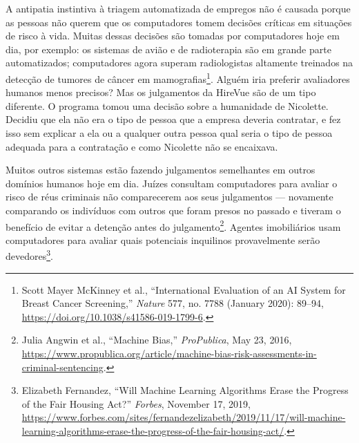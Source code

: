 A antipatia instintiva à triagem automatizada de empregos não é causada porque
as pessoas não querem que os computadores tomem decisões críticas em situações
de risco à vida. Muitas dessas decisões são tomadas por computadores hoje em
dia, por exemplo: os sistemas de avião e de radioterapia são em grande parte 
automatizados; computadores agora superam radiologistas altamente treinados na 
detecção de tumores de câncer em mamografias\footnote{Scott Mayer McKinney et
al., ``International Evaluation of an AI System for Breast Cancer Screening,''
\textit{Nature} 577, no. 7788 (January 2020): 89--94,
\url{https://doi.org/10.1038/s41586-019-1799-6}.}. Alguém iria preferir
avaliadores humanos menos precisos? Mas os julgamentos da HireVue são de um tipo
diferente. O programa tomou uma decisão sobre a humanidade de Nicolette. Decidiu
que ela não era o tipo de pessoa que a empresa deveria contratar, e fez isso sem
explicar a ela ou a qualquer outra pessoa qual seria o tipo de pessoa adequada
para a contratação e como Nicolette não se encaixava.

Muitos outros sistemas estão fazendo julgamentos semelhantes em outros domínios
humanos hoje em dia. Juízes consultam computadores para avaliar o risco de réus 
criminais não comparecerem aos seus julgamentos --- novamente comparando os 
indivíduos com outros que foram presos no passado e tiveram o benefício de 
evitar a detenção antes do julgamento\footnote{Julia Angwin et al., ``Machine
Bias,'' \textit{ProPublica}, May 23, 2016,
\url{https://www.propublica.org/article/machine-bias-risk-assessments-in-criminal-sentencing}.}. Agentes
imobiliários usam computadores para avaliar quais potenciais inquilinos
provavelmente serão devedores\footnote{Elizabeth Fernandez, ``Will Machine
Learning Algorithms Erase the Progress of the Fair Housing Act?''
\textit{Forbes}, November 17, 2019,
\url{https://www.forbes.com/sites/fernandezelizabeth/2019/11/17/will-machine-learning-algorithms-erase-the-progress-of-the-fair-housing-act/}.}.

